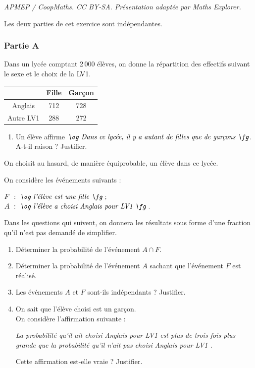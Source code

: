 \documentclass[10pt]{article}
\begin{document}
\noindent\textit{APMEP / CoopMaths. CC BY-SA. Présentation adaptée par Maths Explorer.}\par\medskip
\begin{center}
Les deux parties de cet exercice sont indépendantes.
\end{center}

\subsubsection*{Partie A}
Dans un lycée comptant 2\,000 élèves, on donne la répartition des effectifs suivant le sexe et le choix de la LV1.

\begin{center}
\begin{tabular}{|c|c|c|}
\hline
 & Fille & Garçon \\
\hline
Anglais & 712 & 728 \\
\hline
Autre LV1 & 288 & 272 \\
\hline
\end{tabular}
\end{center}

\begin{enumerate}
\item Un élève affirme $\textit{\og Dans ce lycée, il y a autant de filles que de garçons \fg}$. A-t-il raison ? Justifier.
\end{enumerate}

On choisit au hasard, de manière équiprobable, un élève dans ce lycée.

On considère les événements suivants :

$F~:~\textit{\og l'élève est une fille \fg}~;$ \\
$A~:~\textit{\og l'élève a choisi Anglais pour LV1 \fg}~.$

Dans les questions qui suivent, on donnera les résultats sous forme d'une fraction qu'il n'est pas demandé de simplifier.

\begin{enumerate}[resume]
\item Déterminer la probabilité de l'événement $A \cap F$.

\item Déterminer la probabilité de l'événement $A$ sachant que l'événement $F$ est réalisé.

\item Les événements $A$ et $F$ sont-ils indépendants ? Justifier.

\item On sait que l'élève choisi est un garçon. \\
On considère l'affirmation suivante :

\noindent\begin{minipage}{\linewidth}
\itshape\og La probabilité qu'il ait choisi Anglais pour LV1 est plus de trois fois plus grande que la probabilité qu'il n'ait pas choisi Anglais pour LV1 \fg.
\end{minipage}

Cette affirmation est-elle vraie ? Justifier.
\end{enumerate}
\end{document}
